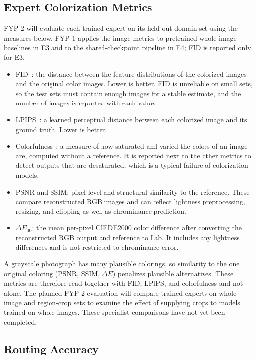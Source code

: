 \documentclass{FastFyp}
\begin{document}
\subsection{Expert Colorization Metrics}
\label{sec:expert-metrics}
FYP-2 will evaluate each trained expert on its held-out domain set using the measures below. FYP-1 applies the image metrics to pretrained whole-image baselines in E3 and to the shared-checkpoint pipeline in E4; FID is reported only for E3.

\begin{itemize}
    \item FID~\cite{heusel2017fid}: the distance between the feature distributions of the colorized images and the original color images. Lower is better. FID is unreliable on small sets, so the test sets must contain enough images for a stable estimate, and the number of images is reported with each value.
    \item LPIPS~\cite{zhang2018lpips}: a learned perceptual distance between each colorized image and its ground truth. Lower is better.
    \item Colorfulness~\cite{hasler2003colorfulness}: a measure of how saturated and varied the colors of an image are, computed without a reference. It is reported next to the other metrics to detect outputs that are desaturated, which is a typical failure of colorization models.
    \item PSNR and SSIM: pixel-level and structural similarity to the reference. These compare reconstructed RGB images and can reflect lightness preprocessing, resizing, and clipping as well as chrominance prediction.
    \item $\Delta E_{00}$: the mean per-pixel CIEDE2000 color difference after converting the reconstructed RGB output and reference to Lab. It includes any lightness differences and is not restricted to chrominance error.
\end{itemize}

A grayscale photograph has many plausible colorings, so similarity to the one original coloring (PSNR, SSIM, $\Delta E$) penalizes plausible alternatives. These metrics are therefore read together with FID, LPIPS, and colorfulness and not alone. The planned FYP-2 evaluation will compare trained experts on whole-image and region-crop sets to examine the effect of supplying crops to models trained on whole images. These specialist comparisons have not yet been completed.

\subsection{Routing Accuracy}
\end{document}
